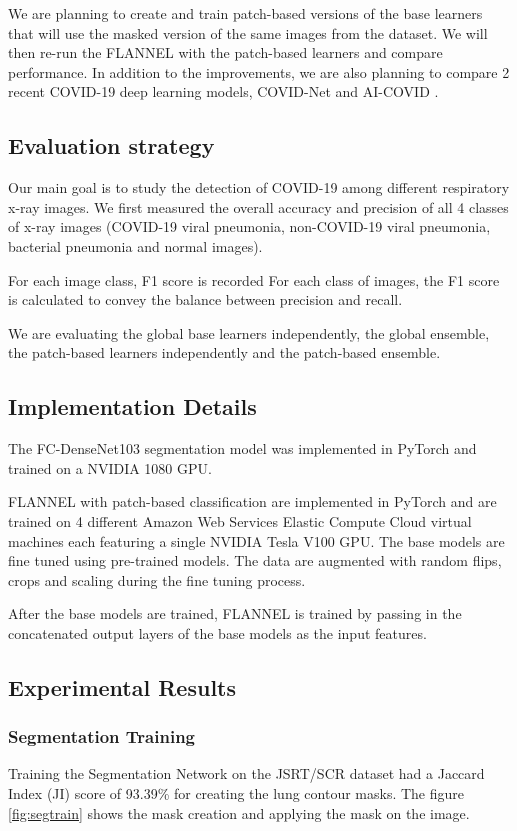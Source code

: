 \documentclass{sigkddExp}
\begin{document}
We are planning to create and train patch-based versions of the base learners
that will use the masked version of the same images from the dataset. We will
then re-run the FLANNEL with the patch-based learners and compare performance.
In addition to the improvements, we are  also planning to compare 2 recent
COVID-19 deep learning models, COVID-Net \cite{wang2020covidnet} and AI-COVID
\cite{pmid32339081}.


\subsection{Evaluation strategy}
Our main goal is to study the detection of COVID-19 among different respiratory
x-ray images. We first measured the overall accuracy and precision of all 4
classes of x-ray images (COVID-19 viral pneumonia, non-COVID-19 viral pneumonia,
bacterial pneumonia and normal images).

For each image class, F1 score is recorded For each class of images, the F1
score is calculated to convey the balance between precision and recall.

We are evaluating the global base learners independently, the global ensemble,
the patch-based learners independently and the patch-based ensemble.

\subsection{Implementation Details}
The FC-DenseNet103 segmentation model was implemented in PyTorch and trained on
a NVIDIA 1080 GPU.

FLANNEL with patch-based classification are implemented in PyTorch and are
trained on 4 different Amazon Web Services Elastic Compute Cloud virtual
machines each featuring a single NVIDIA Tesla V100 GPU. The base models
are fine tuned using pre-trained models. The data are
augmented with random flips, crops and scaling during the fine tuning process.

After the base models are trained, FLANNEL is trained by passing in the
concatenated output layers of the base models as the input features.

\subsection{Experimental Results}
\subsubsection{Segmentation Training}
Training the Segmentation Network on the JSRT/SCR dataset had a Jaccard Index
(JI) score of 93.39\% for creating the lung contour masks. The figure \ref{fig:segtrain}
shows the mask creation and applying the mask on the image.
\end{document}
